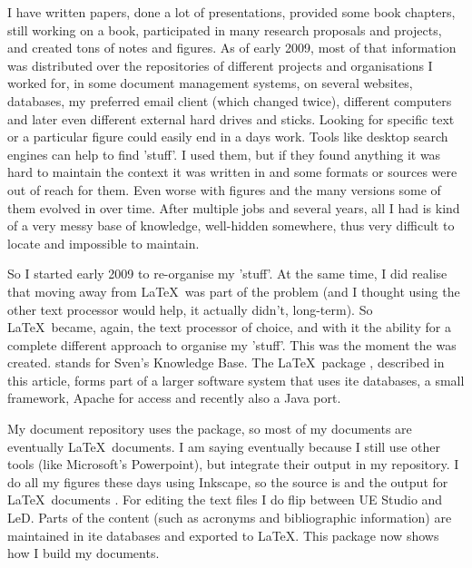 
I have written papers, done a lot of presentations, provided some book chapters,
still working on a book, participated in many research proposals and projects, and
created tons of notes and figures. As of early 2009, most of that information was
distributed over the repositories of different projects and organisations I worked
for, in some document management systems, on several websites, databases, my preferred
email client (which changed twice), different computers and later even different
external hard drives and  sticks. Looking for specific text or a particular figure
could easily end in a days work. Tools like desktop search engines can help to find 
'stuff'. I used them, but if they found anything it was hard to maintain the context
it was written in and some formats or sources were out of reach for them. Even worse
with figures and the many versions some of them evolved in over time. After multiple
jobs and several years, all I had is kind of a very messy base of knowledge, well-hidden
somewhere, thus very difficult to locate and impossible to maintain.

So I started early 2009 to re-organise my 'stuff'. At the same time, I did realise that
moving away from \LaTeX~was part of the problem (and I thought using the other text 
processor would help, it actually didn't, long-term). So \LaTeX~became, again, the 
text processor of choice, and with it the ability for a complete different approach
to organise my 'stuff'. This was the moment the  was created.  stands for Sven's
Knowledge Base. The \LaTeX~package , described in this article, forms part of a larger
software system that uses ite databases, a small  framework, Apache for  access
and recently also a Java port.

My document repository uses the  package, so most of my documents are eventually
\LaTeX~documents. I am saying eventually because I still use other tools (like Microsoft's Powerpoint),
but integrate their output in my repository. I do all my figures these days using Inkscape, so the source
is  and the output for \LaTeX~documents . For editing the text files I do flip between UE Studio
and LeD. Parts of the content (such as acronyms and bibliographic information) are maintained in ite 
databases and exported to \LaTeX. This package now shows how I build my documents.
